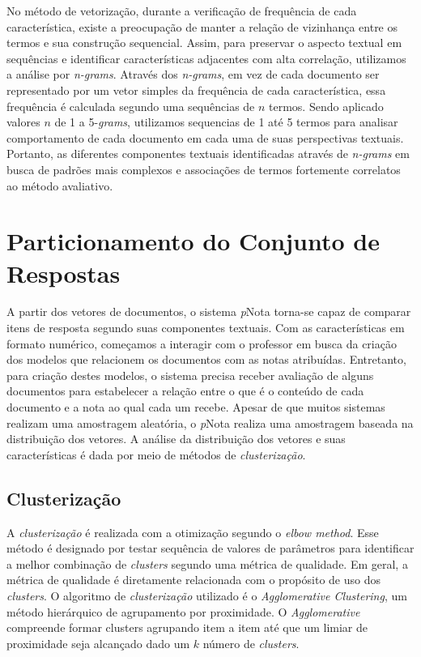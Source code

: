 No método de vetorização, durante a verificação de frequência de cada característica, existe a preocupação de manter a relação de vizinhança entre os termos e sua construção sequencial. Assim, para preservar o aspecto textual em sequências e identificar características adjacentes com alta correlação, utilizamos a análise por \textit{n-grams}. Através dos \textit{n-grams}, em vez de cada documento ser representado por um vetor simples da frequência de cada característica, essa frequência é calculada segundo uma sequências de $ n $ termos. Sendo aplicado valores $ n $ de 1 a 5-\textit{grams}, utilizamos sequencias de 1 até 5 termos para analisar comportamento de cada documento em cada uma de suas perspectivas textuais. Portanto, as diferentes componentes textuais identificadas através de \textit{n-grams} em busca de padrões mais complexos e associações de termos fortemente correlatos ao método avaliativo.

\section{Particionamento do Conjunto de Respostas}

A partir dos vetores de documentos, o sistema \textit{p}Nota torna-se capaz de comparar itens de resposta segundo suas componentes textuais. Com as características em formato numérico, começamos a interagir com o professor em busca da criação dos modelos que relacionem os documentos com as notas atribuídas. Entretanto, para criação destes modelos, o sistema precisa receber avaliação de alguns documentos para estabelecer a relação entre o que é o conteúdo de cada documento e a nota ao qual cada um recebe. Apesar de que muitos sistemas realizam uma amostragem aleatória, o \textit{p}Nota realiza uma amostragem baseada na distribuição dos vetores. A análise da distribuição dos vetores e suas características é dada por meio de métodos de \textit{clusterização}.

\subsection{Clusterização}

A \textit{clusterização} é realizada com a otimização segundo o \textit{elbow method}. Esse método é designado por testar sequência de valores de parâmetros para identificar a melhor combinação de \textit{clusters} segundo uma métrica de qualidade. Em geral, a métrica de qualidade é diretamente relacionada com o propósito de uso dos \textit{clusters}. O algoritmo de \textit{clusterização} utilizado é o \textit{Agglomerative Clustering}, um método hierárquico de agrupamento por proximidade. O \textit{Agglomerative} compreende formar clusters agrupando item a item até que um limiar de proximidade seja alcançado dado um $ k $ número de \textit{clusters}.

